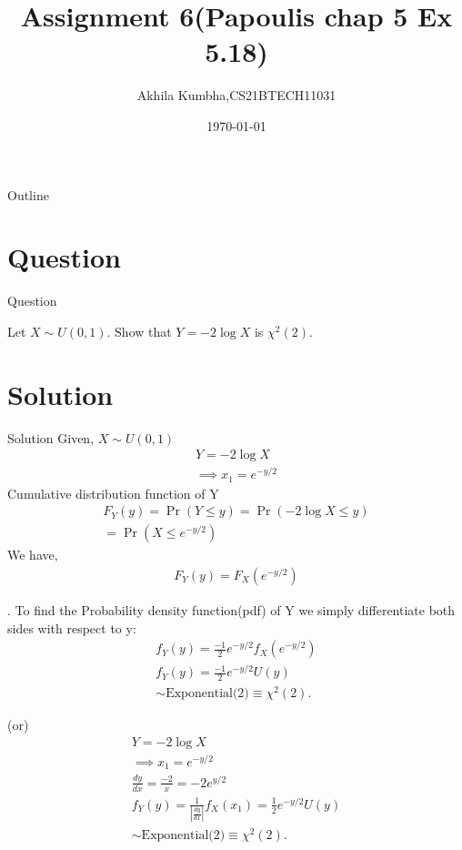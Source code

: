 \documentclass{beamer}
\title{Assignment 6(Papoulis chap 5 Ex 5.18)}
\author{Akhila Kumbha,CS21BTECH11031}
\date{\today}
\providecommand{\brak}[1]{\ensuremath{\left(#1\right)}}
\providecommand{\pr}[1]{\ensuremath{\Pr\left(#1\right)}}
\begin{document}
\begin{frame}
    \titlepage 
\end{frame}

\logo{}

\begin{frame}{Outline}
    \tableofcontents
\end{frame}


\section{Question}
\begin{frame}{Question}

Let $X \sim U\brak{0,1}$. Show that $Y= -2\log{X}$ is $\chi^2(2)$.

\end{frame}


\section{Solution}
\begin{frame}{Solution}
Given,  $X \sim U\brak{0,1}$
\begin{align*}
Y= -2\log{X}\\
\implies x_1 = e^{-y/2}
\end{align*}
Cumulative distribution function of Y
\begin{align*}
F_Y(y) = \pr{Y\leq y} = \pr{-2\log{X}\leq y}\\ = \pr{X\leq e^{-y/2}}
\end{align*}
We have,
\begin{align*}
F_Y(y) = F_X(e^{-y/2})
\end{align*}

\end{frame} 

\begin{frame}
.  To find the Probability density function(pdf) of Y we simply differentiate both sides with respect to y:
\begin{align*}
f_Y(y)=\frac{-1}{2}e^{-y/2}f_X( e^{-y/2})\\
f_Y(y)=\frac{-1}{2}e^{-y/2}U(y)\\
\sim \text{Exponential(2)} \equiv \chi^2(2).
\end{align*} 
\end{frame}
\begin{frame}
\center (or)\\
\begin{align*}
Y= -2\log{X}\\
\implies x_1 = e^{-y/2}\\
\frac{dy}{dx}=\frac{-2}{x}=-2e^{y/2}\\
f_Y(y)=\frac{1}{|\frac{dy}{dx}|}f_X(x_1)=\frac{1}{2}e^{-y/2}U(y)\\
\sim \text{Exponential(2)} \equiv \chi^2(2).
\end{align*}
\end{frame}
\end{document}

